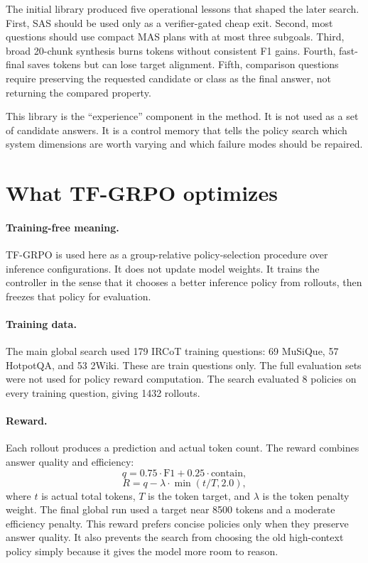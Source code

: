 \documentclass[10pt]{article}
\begin{document}
The initial library produced five operational lessons that shaped the later search. First, SAS should be used only as a verifier-gated cheap exit. Second, most questions should use compact MAS plans with at most three subgoals. Third, broad 20-chunk synthesis burns tokens without consistent F1 gains. Fourth, fast-final saves tokens but can lose target alignment. Fifth, comparison questions require preserving the requested candidate or class as the final answer, not returning the compared property.

This library is the ``experience'' component in the method. It is not used as a set of candidate answers. It is a control memory that tells the policy search which system dimensions are worth varying and which failure modes should be repaired.

\section{What TF-GRPO optimizes}

\paragraph{Training-free meaning.}
TF-GRPO is used here as a group-relative policy-selection procedure over inference configurations. It does not update model weights. It trains the controller in the sense that it chooses a better inference policy from rollouts, then freezes that policy for evaluation.

\paragraph{Training data.}
The main global search used 179 IRCoT training questions: 69 MuSiQue, 57 HotpotQA, and 53 2Wiki. These are train questions only. The full evaluation sets were not used for policy reward computation. The search evaluated 8 policies on every training question, giving 1432 rollouts.

\paragraph{Reward.}
Each rollout produces a prediction and actual token count. The reward combines answer quality and efficiency:
\begin{equation}
q = 0.75 \cdot \text{F1} + 0.25 \cdot \text{contain},
\end{equation}
\begin{equation}
R = q - \lambda \cdot \min(t / T, 2.0),
\end{equation}
where $t$ is actual total tokens, $T$ is the token target, and $\lambda$ is the token penalty weight. The final global run used a target near 8500 tokens and a moderate efficiency penalty. This reward prefers concise policies only when they preserve answer quality. It also prevents the search from choosing the old high-context policy simply because it gives the model more room to reason.
\end{document}
